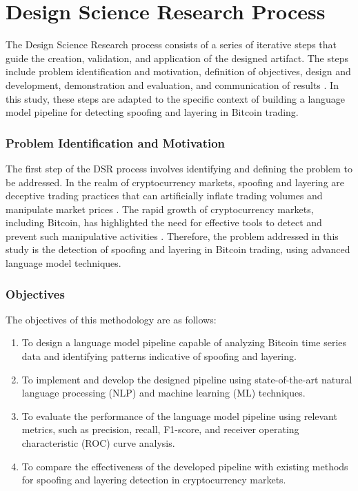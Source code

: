 \section{Design Science Research Process}
The Design Science Research process consists of a series of iterative steps that guide the creation, validation, and
application of the designed artifact. The steps include problem identification and motivation, definition of objectives,
design and development, demonstration and evaluation, and communication of results \cite{hevner2010design,
peffers2007design}. In this study, these steps are adapted to the specific context of building a language model pipeline
for detecting spoofing and layering in Bitcoin trading.

\subsubsection{Problem Identification and Motivation}
The first step of the DSR process involves identifying and defining the problem to be addressed. In the realm of
cryptocurrency markets, spoofing and layering are deceptive trading practices that can artificially inflate trading
volumes and manipulate market prices \cite{gandal2018price, cartea2016algorithmic}. The rapid growth of cryptocurrency
markets, including Bitcoin, has highlighted the need for effective tools to detect and prevent such manipulative
activities \cite{chan2017statistical}. Therefore, the problem addressed in this study is the detection of spoofing and
layering in Bitcoin trading, using advanced language model techniques.

\subsubsection{Objectives}
The objectives of this methodology are as follows:

\begin{enumerate}
    \item To design a language model pipeline capable of analyzing Bitcoin time series data and identifying patterns
    indicative of spoofing and layering.
    \item To implement and develop the designed pipeline using state-of-the-art natural language processing (NLP) and
    machine learning (ML) techniques.
    \item To evaluate the performance of the language model pipeline using relevant metrics, such as precision, recall,
    F1-score, and receiver operating characteristic (ROC) curve analysis.
    \item To compare the effectiveness of the developed pipeline with existing methods for spoofing and layering
    detection in cryptocurrency markets.
\end{enumerate}


